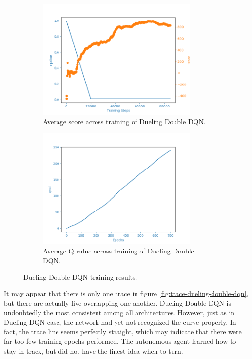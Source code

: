 \begin{figure}[htb]
\begin{subfigure}{.48\textwidth}
    \centering
    \includegraphics[width=8cm]{img/DuelingDDQNAgent_WamvNavTwoSetsBuoys-v0_normal_1125_0937.png}
    \caption{Average score across training of Dueling Double DQN.}
    \label{fig:avg-score-dddqn}
\end{subfigure}
\begin{subfigure}{.48\textwidth}
    \centering
    \includegraphics[width=8cm]{img/DuelingDDQNAgent_WamvNavTwoSetsBuoys-v0_normal_1125_0937_qval.png}
    \caption{Average Q-value across training of Dueling Double DQN.}
\end{subfigure}
\caption{Dueling Double DQN training results.}
\label{fig:results-dddqn}
\end{figure}

It may appear that there is only one trace in figure \ref{fig:trace-dueling-double-dqn}, but there are actually five overlapping one another. Dueling Double DQN is undoubtedly the most consistent among all architectures. However, just as in Dueling DQN case, the network
had yet not recognized the curve properly. In fact, the trace line seems perfectly straight, which may indicate that there were far too few training epochs performed. The autonomous agent learned how to stay in track, but did not have the finest idea when to turn.

